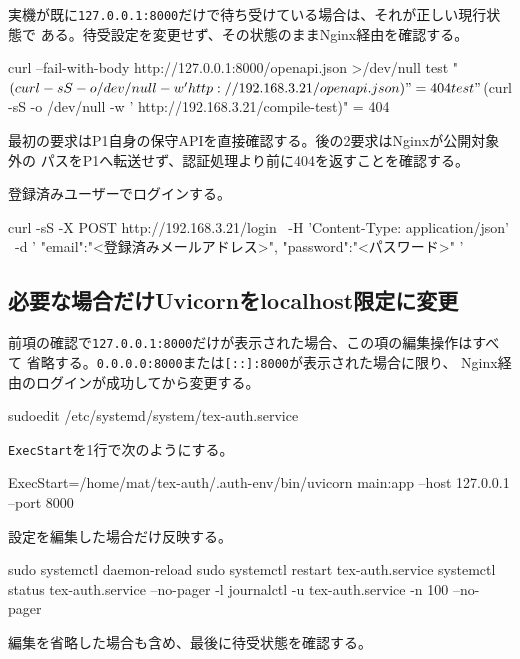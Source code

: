 \documentclass[uplatex,a4paper,11pt]{jsarticle}
\begin{document}
実機が既に\texttt{127.0.0.1:8000}だけで待ち受けている場合は、それが正しい現行状態で
ある。待受設定を変更せず、その状態のままNginx経由を確認する。

\begin{command}
curl --fail-with-body http://127.0.0.1:8000/openapi.json >/dev/null
test "$(curl -sS -o /dev/null -w '%
  http://192.168.3.21/openapi.json)" = 404
test "$(curl -sS -o /dev/null -w '%
  http://192.168.3.21/compile-test)" = 404
\end{command}

最初の要求はP1自身の保守APIを直接確認する。後の2要求はNginxが公開対象外の
パスをP1へ転送せず、認証処理より前に404を返すことを確認する。

登録済みユーザーでログインする。

\begin{command}
curl -sS -X POST http://192.168.3.21/login \
  -H 'Content-Type: application/json' \
  -d '{
    "email":"<登録済みメールアドレス>",
    "password":"<パスワード>"
  }'
\end{command}

\subsection{必要な場合だけUvicornをlocalhost限定に変更}

前項の確認で\texttt{127.0.0.1:8000}だけが表示された場合、この項の編集操作はすべて
省略する。\texttt{0.0.0.0:8000}または\texttt{[::]:8000}が表示された場合に限り、
Nginx経由のログインが成功してから変更する。

\begin{command}
sudoedit /etc/systemd/system/tex-auth.service
\end{command}

\texttt{ExecStart}を1行で次のようにする。

\begin{command}
ExecStart=/home/mat/tex-auth/.auth-env/bin/uvicorn main:app --host 127.0.0.1 --port 8000
\end{command}

設定を編集した場合だけ反映する。

\begin{command}
sudo systemctl daemon-reload
sudo systemctl restart tex-auth.service
systemctl status tex-auth.service --no-pager -l
journalctl -u tex-auth.service -n 100 --no-pager
\end{command}

編集を省略した場合も含め、最後に待受状態を確認する。
\end{document}
